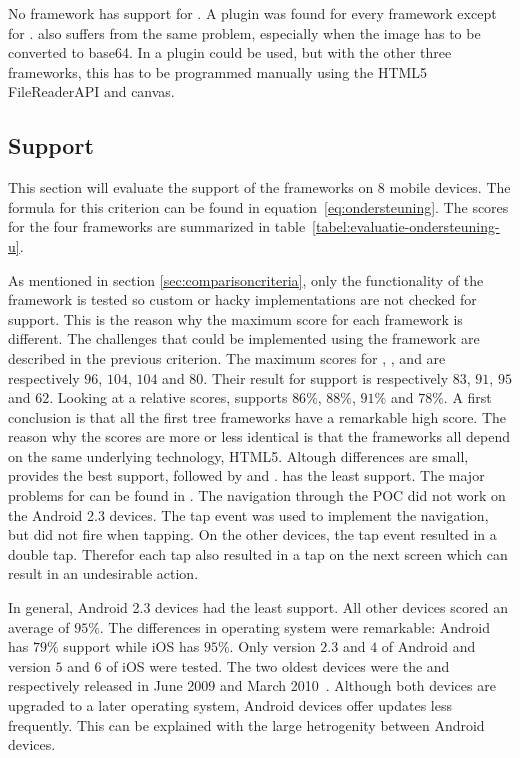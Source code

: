 \documentclass[a4paper]{artikel3}
\begin{document}
No framework has support for .
A plugin was found for every framework except for \lungo{}.
 also suffers from the same problem, especially when the image has to be converted to base64.
In \sta{} a plugin could be used, but with the other three frameworks, this has to be programmed manually using the HTML5 FileReaderAPI and canvas. 


\subsection{Support} %
\label{sec:evaluation-support}

This section will evaluate the support of the frameworks on $8$ mobile devices.
The formula for this criterion can be found in equation~\ref{eq:ondersteuning}.
The scores for the four frameworks are summarized in table~\ref{tabel:evaluatie-ondersteuning-u}.


As mentioned in section \ref{sec:comparisoncriteria},  only the functionality of the framework is tested so custom or hacky implementations are not checked for support.
This is the reason why the maximum score for each framework is different.
The challenges that could be implemented using the framework are described in the previous criterion.
The maximum scores for \sta{},  \kendoa{},  \jqma{} and \lungo{} are respectively $96$, $104$, $104$ and $80$.
Their result for support is respectively $83$, $91$, $95$ and $62$.
Looking at a relative scores,  \sta{} supports $86\%$,  \kendoa{} $88\%$,  \jqma{} $91\%$ and \lungo{} $78\%$.
A first conclusion is that all the first tree frameworks have a remarkable high score.
The reason why the scores are more or less identical is that the frameworks all depend on the same underlying technology,  HTML5.
Altough differences are small,  \jqma{} provides the best support,  followed by \kendoa{} and \sta{}.
\lungo{} has the least support.
The major problems for \lungo{} can be found in .
The navigation through the POC did not work on the Android 2.3 devices. 
The tap event was used to implement the navigation, but did not fire when tapping.
On the other devices, the tap event resulted in a double tap.
Therefor each tap also resulted in a tap on the next screen which can result in an undesirable action.

In general,  Android 2.3 devices had the least support.
All other devices scored an average of $95\%$.
The differences in operating system were remarkable:  Android has $79\%$ support while iOS has $95\%$.
Only version $2.3$ and $4$ of Android and version $5$ and $6$ of iOS were tested.
The two oldest devices were the \iphoneiii{} and \gs{} respectively released in June 2009 and March 2010~\cite{Staff2009,Gideon2010}.
Although both devices are upgraded to a later operating system,  Android devices offer updates less frequently.
This can be explained with the large hetrogenity between Android devices.
\end{document}

